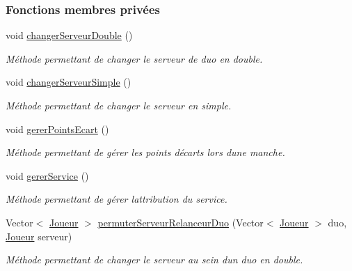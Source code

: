 \subsubsection*{Fonctions membres privées}
\begin{DoxyCompactItemize}
\item 
void \hyperlink{classcom_1_1example_1_1area_1_1_partie_a14ae07774755900e3ae4e7e6808126c6}{changer\+Serveur\+Double} ()
\begin{DoxyCompactList}\small\item\em Méthode permettant de changer le serveur de duo en double. \end{DoxyCompactList}\item 
void \hyperlink{classcom_1_1example_1_1area_1_1_partie_ad6d7eef6348a783f9cdd0eb3dd14793d}{changer\+Serveur\+Simple} ()
\begin{DoxyCompactList}\small\item\em Méthode permettant de changer le serveur en simple. \end{DoxyCompactList}\item 
void \hyperlink{classcom_1_1example_1_1area_1_1_partie_a2838da99f206d736a22f8a3f271365b2}{gerer\+Points\+Ecart} ()
\begin{DoxyCompactList}\small\item\em Méthode permettant de gérer les points d\textquotesingle{}écarts lors d\textquotesingle{}une manche. \end{DoxyCompactList}\item 
void \hyperlink{classcom_1_1example_1_1area_1_1_partie_a52c8e133b23468d4b2c4338a80c3763c}{gerer\+Service} ()
\begin{DoxyCompactList}\small\item\em Méthode permettant de gérer l\textquotesingle{}attribution du service. \end{DoxyCompactList}\item 
Vector$<$ \hyperlink{classcom_1_1example_1_1area_1_1_joueur}{Joueur} $>$ \hyperlink{classcom_1_1example_1_1area_1_1_partie_a3143072ab9e3a306a42a84ecac4bdcf1}{permuter\+Serveur\+Relanceur\+Duo} (Vector$<$ \hyperlink{classcom_1_1example_1_1area_1_1_joueur}{Joueur} $>$ duo, \hyperlink{classcom_1_1example_1_1area_1_1_joueur}{Joueur} serveur)
\begin{DoxyCompactList}\small\item\em Méthode permettant de changer le serveur au sein d\textquotesingle{}un duo en double. \end{DoxyCompactList}\item 

\end{DoxyCompactItemize}
